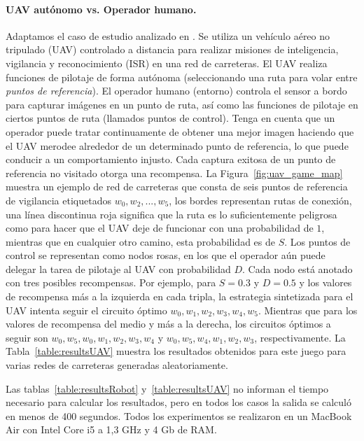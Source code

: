 \paragraph{UAV autónomo vs. Operador humano.} Adaptamos el caso de estudio analizado en \cite{DBLP:conf/iccps/FengWHT15}. Se utiliza un vehículo aéreo no tripulado (UAV) controlado a distancia para realizar misiones de inteligencia, vigilancia y reconocimiento (ISR) en una red de carreteras. El UAV realiza funciones de pilotaje de forma autónoma (seleccionando una ruta para volar entre \emph{puntos de referencia}). El operador humano (entorno) controla el sensor a bordo para capturar imágenes en un punto de ruta, así como las funciones de pilotaje en ciertos puntos de ruta (llamados puntos de control). Tenga en cuenta que un operador puede tratar continuamente de obtener una mejor imagen haciendo que el UAV merodee alrededor de un determinado punto de referencia, lo que puede conducir a un comportamiento injusto.
Cada captura exitosa de un punto de referencia no visitado otorga una recompensa.
%
La Figura~\ref{fig:uav_game_map} muestra un ejemplo de red de carreteras que consta de seis puntos de referencia de vigilancia etiquetados $w_0,w_2,...,w_5$, los bordes representan rutas de conexión, una línea discontinua roja significa que la ruta es lo suficientemente peligrosa como para hacer que el UAV deje de funcionar con una probabilidad de $1$, mientras que en cualquier otro camino, esta probabilidad es de $S$. Los puntos de control se representan como nodos rosas, en los que el operador aún puede delegar la tarea de pilotaje al UAV con probabilidad $D$. Cada nodo está anotado con tres posibles recompensas. Por ejemplo, para $S=0.3$ y $D=0.5$ y los valores de recompensa más a la izquierda en cada tripla, la estrategia sintetizada para el UAV intenta seguir el circuito óptimo $w_0,w_1,w_2,w_3,w_4,w_5$. Mientras que para los valores de recompensa del medio y más a la derecha, los circuitos óptimos a seguir son $w_0,w_5,w_0,w_1,w_2,w_3,w_4$ y $w_0,w_5,w_4,w_1,w_2,w_3$, respectivamente. La Tabla~\ref{table:resultsUAV} muestra los resultados obtenidos para este juego para varias redes de carreteras generadas aleatoriamente.

Las tablas~\ref{table:resultsRobot} y~\ref{table:resultsUAV} no informan el tiempo necesario para calcular los resultados, pero en todos los casos la salida se calculó en menos de 400 segundos. Todos los experimentos se realizaron en un MacBook Air con Intel Core i5 a 1,3 GHz y 4 Gb de RAM.%

